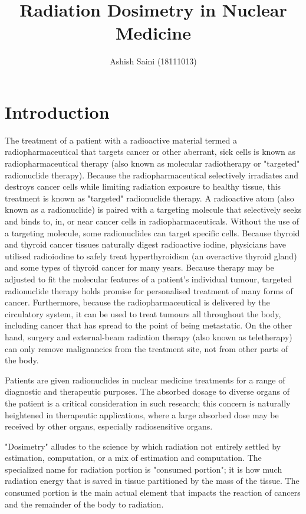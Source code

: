 \documentclass[12pt]{article}
\begin{document}
\title{Radiation Dosimetry in Nuclear Medicine}
\author{Ashish Saini (18111013)}

\maketitle


\section{Introduction}

The treatment of a patient with a radioactive material termed a radiopharmaceutical that targets cancer or other aberrant, sick cells is known as radiopharmaceutical therapy (also known as molecular radiotherapy or "targeted" radionuclide therapy). Because the radiopharmaceutical selectively irradiates and destroys cancer cells while limiting radiation exposure to healthy tissue, this treatment is known as "targeted" radionuclide therapy. A radioactive atom (also known as a radionuclide) is paired with a targeting molecule that selectively seeks and binds to, in, or near cancer cells in radiopharmaceuticals. Without the use of a targeting molecule, some radionuclides can target specific cells. Because thyroid and thyroid cancer tissues naturally digest radioactive iodine, physicians have utilised radioiodine to safely treat hyperthyroidism (an overactive thyroid gland) and some types of thyroid cancer for many years. Because therapy may be adjusted to fit the molecular features of a patient's individual tumour, targeted radionuclide therapy holds promise for personalised treatment of many forms of cancer. Furthermore, because the radiopharmaceutical is delivered by the circulatory system, it can be used to treat tumours all throughout the body, including cancer that has spread to the point of being metastatic. On the other hand, surgery and external-beam radiation therapy (also known as teletherapy) can only remove malignancies from the treatment site, not from other parts of the body.
\par
Patients are given radionuclides in nuclear medicine treatments for a range of diagnostic and therapeutic purposes. The absorbed dosage to diverse organs of the patient is a critical consideration in such research; this concern is naturally heightened in therapeutic applications, where a large absorbed dose may be received by other organs, especially radiosensitive organs. 
\par
"Dosimetry" alludes to the science by which radiation not entirely settled by estimation, computation, or a mix of estimation and computation. The specialized name for radiation portion is "consumed portion"; it is how much radiation energy that is saved in tissue partitioned by the mass of the tissue. The consumed portion is the main actual element that impacts the reaction of cancers and the remainder of the body to radiation.
\end{document}
